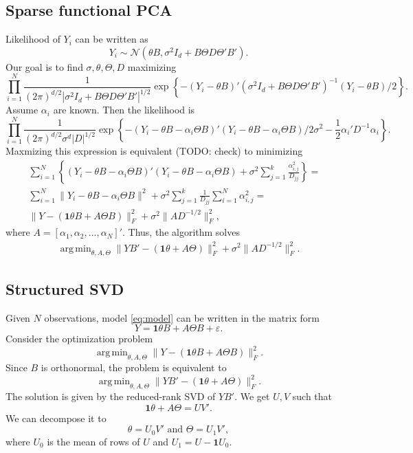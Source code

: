 \documentclass{article}
\newcommand{\cN}{\mathcal{N}}
\DeclareMathOperator*{\argmin}{arg\,min}
\begin{document}
\subsection{Sparse functional PCA}
Likelihood of $Y_i$ can be written as
\[
Y_i \sim \cN(\theta B, \sigma^2 I_d + B \Theta D \Theta' B').
\]
Our goal is to find $\sigma, \theta, \Theta, D$ maximizing
\[
\prod_{i=1}^N \frac{1}{(2\pi)^{d/2} |\sigma^2I_d + B \Theta D \Theta' B'|^{1/2}} \exp\left\{ -(Y_i - \theta B)'(\sigma^2 I_d + B \Theta D \Theta'B' )^{-1} (Y_i -  \theta B) / 2\right\}.
\]
Assume $\alpha_i$ are known. Then the likelihood is
\[
\prod_{i=1}^N \frac{1}{(2\pi)^{d/2} \sigma^d |D|^{1/2}} \exp\left\{ -(Y_i - \theta B - \alpha_i\Theta B)'(Y_i -  \theta B - \alpha_i\Theta B) / 2\sigma^2 - \frac{1}{2}\alpha_i' D^{-1} \alpha_i \right\}.
\]
Maxmizing this expression is equivalent (TODO: check) to minimizing
\begin{align*}
\sum_{i=1}^N \left\{ (Y_i - \theta B - \alpha_i\Theta B)'(Y_i -  \theta B - \alpha_i\Theta B) + \sigma^2 \sum_{j=1}^k \frac{\alpha_{i,j}^2}{D_{jj}}\right\} =&\\
\sum_{i=1}^N \| Y_i - \theta B - \alpha_i\Theta B\|^2 + \sigma^2 \sum_{j=1}^k \frac{1}{D_{jj}}\sum_{i=1}^N\alpha_{i,j}^2 =&\\
\| Y - (\mathbf{1}\theta B + A\Theta B)\|_F^2 + \sigma^2 \| A D^{-1/2} \|_F^2,
\end{align*}
where $A = [\alpha_1,\alpha_2,...,\alpha_N]'$.
Thus, the algorithm solves
\begin{align}\label{eq:optpca}
\argmin_{\theta,A,\Theta}\| Y B' - ( \mathbf{1}\theta + A\Theta)\|_F^2 + \sigma^2 \| A D^{-1/2} \|_F^2.
\end{align}

\subsection{Structured SVD}
Given $N$ observations, model \eqref{eq:model} can be written in the matrix form
\[
Y = \mathbf{1}\theta B + A \Theta B + \varepsilon.
\]
Consider the optimization problem
\[
\argmin_{\theta, A, \Theta} \| Y - (\mathbf{1}\theta B + A \Theta B)\|_F^2.
\]
Since $B$ is orthonormal, the problem is equivalent to 
\[
\argmin_{\theta, A, \Theta} \| YB' - (\mathbf{1}\theta + A \Theta)\|_F^2. 
\]
The solution is given by the reduced-rank SVD of $YB'$. We get $U,V$ such that
\[
\mathbf{1}\theta + A \Theta = UV'.
\]
We can decompose it to 
\[
\theta = U_0V' \text{ and } \Theta = U_1 V',
\]
where $U_0$ is the mean of rows of $U$ and $U_1 = U - \mathbf{1}U_0$.
\end{document}
